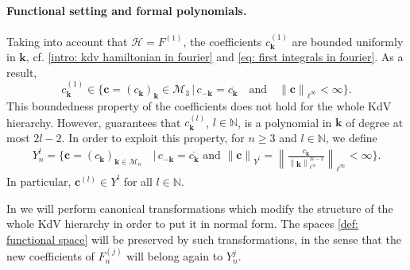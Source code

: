 \documentclass[a4paper,10pt,reqno]{article}
\theoremstyle{definition}
\theoremstyle{plain}
\theoremstyle{plain}
\theoremstyle{definition}
\theoremstyle{plain}
\theoremstyle{plain}
\theoremstyle{plain}
\theoremstyle{definition}
\theoremstyle{definition}
\newcommand{\norm}[1]{\left\lVert #1 \right\rVert}
\def \N{\mathbb N}
\def \H{\mathcal{H}}
\def \M{\mathcal{M}}
\def \k{\bm{k}}
\begin{document}
\paragraph{Functional setting and formal polynomials.}

Taking into account that $\H=F^{(1)}$, the coefficients $c_{\k}^{(1)}$ are bounded uniformly in $\k$, cf. \eqref{intro: kdv hamiltonian in fourier} and \eqref{eq: first integrals in fourier}. As a result,
\[
c_{\k}^{(1)} \in \{ \bm{c} = (c_{\k})_{\k} \in \M_3 \, \lvert \, c_{-\k}=\overline{c_{\k}} \quad \text{and} \quad \norm{\bm{c}}_{\ell^{\infty}} < \infty \}.
\]
This boundedness property of the coefficients does not hold for the whole KdV hierarchy. 
However,  guarantees that $c_{\k}^{(l)}$, $l\in\N$, is a polynomial in $\k$ of degree at most $2l-2$. 
In order to exploit this property, for $n \ge 3$ and $l \in \N$, we define
\begin{equation}
\begin{split}
Y_n^{l} = \bigg \{ \bm{c} = (c_{\bm{k}})_{{\bm{k}} \in \mathcal{M}_n} \, & \bigg | \, c_{-\bm{k}}= \overline{c_{\bm{k}}} \, \, \text{and} \, \, \norm{\bm{c}}_{Y^l} = \norm{\frac{c_{\bm{k}}}{\norm{\k}_{\ell^{\infty}}^{2l-2}}}_{\ell^{\infty}} < \infty \bigg \}.
\end{split}
\label{def: functional space}
\end{equation}
In particular, $\bm{c}^{(l)} \in Y^l$ for all $l \in \N$.

In  we will perform canonical transformations which modify the structure of the whole KdV hierarchy in order to put it in normal form.
The spaces \eqref{def: functional space} will be preserved by such transformations, in the sense that the new coefficients of $F_n^{(j)}$ will belong again to $Y_n^j.$ 
\end{document}
